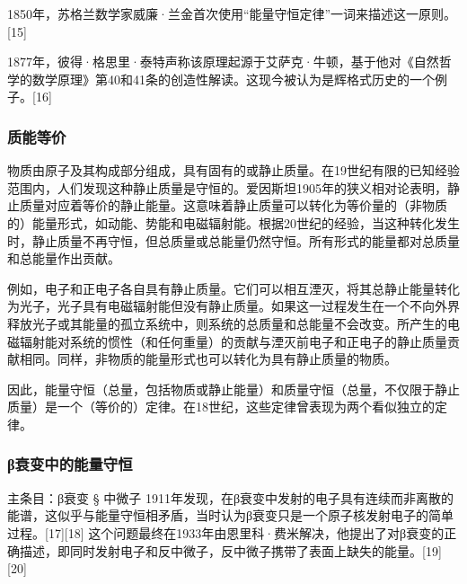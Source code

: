 1850年，苏格兰数学家威廉·兰金首次使用“能量守恒定律”一词来描述这一原则。[15]

1877年，彼得·格思里·泰特声称该原理起源于艾萨克·牛顿，基于他对《自然哲学的数学原理》第40和41条的创造性解读。这现今被认为是辉格式历史的一个例子。[16]
\subsubsection{质能等价}
物质由原子及其构成部分组成，具有固有的或静止质量。在19世纪有限的已知经验范围内，人们发现这种静止质量是守恒的。爱因斯坦1905年的狭义相对论表明，静止质量对应着等价的静止能量。这意味着静止质量可以转化为等价量的（非物质的）能量形式，如动能、势能和电磁辐射能。根据20世纪的经验，当这种转化发生时，静止质量不再守恒，但总质量或总能量仍然守恒。所有形式的能量都对总质量和总能量作出贡献。

例如，电子和正电子各自具有静止质量。它们可以相互湮灭，将其总静止能量转化为光子，光子具有电磁辐射能但没有静止质量。如果这一过程发生在一个不向外界释放光子或其能量的孤立系统中，则系统的总质量和总能量不会改变。所产生的电磁辐射能对系统的惯性（和任何重量）的贡献与湮灭前电子和正电子的静止质量贡献相同。同样，非物质的能量形式也可以转化为具有静止质量的物质。

因此，能量守恒（总量，包括物质或静止能量）和质量守恒（总量，不仅限于静止质量）是一个（等价的）定律。在18世纪，这些定律曾表现为两个看似独立的定律。
\subsubsection{β衰变中的能量守恒}  
主条目：β衰变 § 中微子  
1911年发现，在β衰变中发射的电子具有连续而非离散的能谱，这似乎与能量守恒相矛盾，当时认为β衰变只是一个原子核发射电子的简单过程。[17][18] 这个问题最终在1933年由恩里科·费米解决，他提出了对β衰变的正确描述，即同时发射电子和反中微子，反中微子携带了表面上缺失的能量。[19][20]
